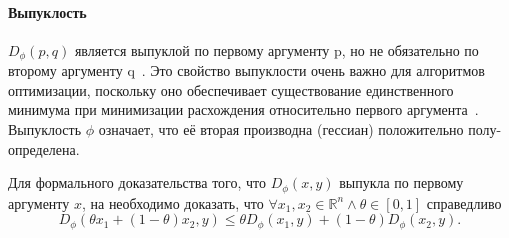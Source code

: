 \documentclass[12pt]{scrartcl}
\begin{document}
\paragraph{Выпуклость} $D_\phi(p,q)$ является выпуклой по первому аргументу p, но не обязательно по второму аргументу q~\cite{Nielsen2017}. Это свойство выпуклости очень важно для алгоритмов оптимизации, поскольку оно обеспечивает существование единственного минимума при минимизации расхождения относительно первого аргумента~\cite{Frigyik2008a}. Выпуклость $\phi$ означает, что её вторая производна (гессиан) положительно полу-определена.

Для формального доказательства того, что $D_\phi(x,y)$ выпукла по первому аргументу $x$, на необходимо доказать, что $\forall x_{1}, x_{2} \in \mathbb{R}^{n} \wedge \theta \in [0,1]$ справедливо
\begin{equation}\label{eq:convexity_01}
    D_{\phi}(\theta x_{1} + (1 - \theta)x_2, y) \leq \theta D_{\phi}(x_{1}, y) + (1 - \theta)D_{\phi}(x_{2}, y).
\end{equation}
\end{document}
